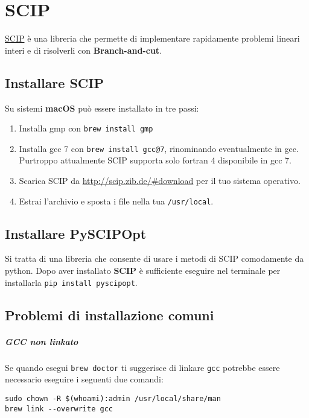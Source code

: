 \documentclass[\main/main.tex]{subfiles}
\begin{document}
\chapter{SCIP}
\href{http://scip.zib.de/#scipoptsuite}{SCIP} è una libreria che permette di implementare rapidamente problemi lineari interi e di risolverli con \textbf{Branch-and-cut}.

\section{Installare SCIP}
Su sistemi \textbf{macOS} può essere installato in tre passi:

\begin{enumerate}
    \item Installa gmp con \texttt{brew install gmp}
    \item Installa gcc 7 con \texttt{brew install gcc@7}, rinominando eventualmente in gcc. Purtroppo attualmente SCIP supporta solo fortran 4 disponibile in gcc 7.
    \item Scarica SCIP da \url{http://scip.zib.de/#download} per il tuo sistema operativo.
    \item Estrai l'archivio e sposta i file nella tua \texttt{/usr/local}.
\end{enumerate}

\section{Installare PySCIPOpt}
Si tratta di una libreria che consente di usare i metodi di SCIP comodamente da python. Dopo aver installato \textbf{SCIP} è sufficiente eseguire nel terminale per installarla \texttt{pip install pyscipopt}.

\section{Problemi di installazione comuni}
\paragraph*{GCC non linkato}
Se quando esegui \texttt{brew doctor} ti suggerisce di linkare \texttt{gcc} potrebbe essere necessario eseguire i seguenti due comandi:

\begin{verbatim}
sudo chown -R $(whoami):admin /usr/local/share/man
brew link --overwrite gcc
\end{verbatim}
\end{document}
